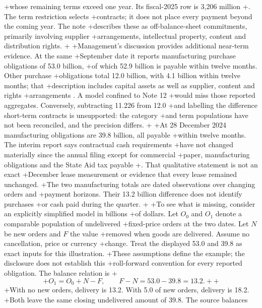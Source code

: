 +whose remaining terms exceed one year. Its fiscal-2025 row is 3,206 million
+\citep[Note 12, printed p.~45]{apple2024}. The term restriction selects
+contracts; it does not place every payment beyond the coming year. The note
+describes these as off-balance-sheet commitments, primarily involving supplier
+arrangements, intellectual property, content and distribution rights.
+
+Management's discussion provides additional near-term evidence. At the same
+September date it reports manufacturing purchase obligations of 53.0 billion,
+of which 52.9 billion is payable within twelve months. Other purchase
+obligations total 12.0 billion, with 4.1 billion within twelve months; that
+description includes capital assets as well as supplier, content and rights
+arrangements \citep[printed p.~25]{apple2024}. A model confined to Note 12
+would miss those reported aggregates. Conversely, subtracting 11.226 from 12.0
+and labelling the difference short-term contracts is unsupported: the category
+and term populations have not been reconciled, and the precision differs.
+
+At 28 December 2024 manufacturing obligations are 39.8 billion, all payable
+within twelve months. The interim report says contractual cash requirements
+have not changed materially since the annual filing except for commercial
+paper, manufacturing obligations and the State Aid tax payable
+\citep[printed p.~16]{apple2025q1}. That qualitative statement is not an exact
+December lease measurement or evidence that every lease remained unchanged.
+The two manufacturing totals are dated observations over changing orders and
+payment horizons. Their 13.2 billion difference does not identify purchases
+or cash paid during the quarter.
+
+To see what is missing, consider an explicitly simplified model in billions
+of dollars. Let $O_0$ and $O_1$ denote a comparable population of undelivered
+fixed-price orders at the two dates. Let $N$ be new orders and $F$ the value
+removed when goods are delivered. Assume no cancellation, price or currency
+change. Treat the displayed 53.0 and 39.8 as exact inputs for this illustration.
+These assumptions define the example; the disclosure does not establish this
+roll-forward convention for every reported obligation. The balance relation is
+\begin{equation}
+ O_1=O_0+N-F,\qquad F-N=53.0-39.8=13.2.
+ \label{eq:apple-commitment-movement}
+\end{equation}
+With no new orders, delivery is 13.2. With 5.0 of new orders, delivery is 18.2.
+Both leave the same closing undelivered amount of 39.8. The source balances
